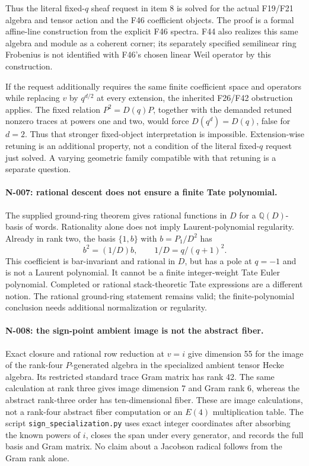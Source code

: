 Thus the literal fixed-$q$ sheaf request in item 8 is solved for the
actual F19/F21 algebra and tensor action and the F46 coefficient
objects.  The proof is a formal affine-line construction from the
explicit F46 spectra.  F44 also realizes this same algebra and
module as a coherent corner; its separately specified semilinear
ring Frobenius is not identified with F46's chosen linear Weil
operator by this construction.

If the request additionally requires the same finite coefficient
space and operators while replacing $v$ by $q^{d/2}$ at every extension,
the inherited F26/F42 obstruction applies.  The fixed relation
$P^2=D(q)P$, together with the demanded retuned nonzero traces at
powers one and two, would force $D(q^d)=D(q)$, false for $d=2$.
Thus that stronger fixed-object interpretation is impossible.
Extension-wise retuning is an additional property, not a condition of
the literal fixed-$q$ request just solved.  A varying geometric family
compatible with that retuning is a separate question.

\paragraph{N-007: rational descent does not ensure a finite Tate polynomial.}
The supplied ground-ring theorem gives rational functions in $D$ for
a $\mathbb Q(D)$-basis of words.  Rationality alone does not imply
Laurent-polynomial regularity.  Already in rank two, the basis
$\{1,b\}$ with $b=P_1/D^2$ has
\[
                        b^2=(1/D)b,
 \qquad 1/D=q/(q+1)^2.
\]
This coefficient is bar-invariant and rational in $D$, but has a pole
at $q=-1$ and is not a Laurent polynomial.  It cannot be a finite
integer-weight Tate Euler polynomial.  Completed or rational
stack-theoretic Tate expressions are a different notion.  The
rational ground-ring statement remains valid; the finite-polynomial
conclusion needs additional normalization or regularity.

\paragraph{N-008: the sign-point ambient image is not the abstract fiber.}
Exact closure and rational row reduction at $v=i$ give dimension 55
for the image of the rank-four $P$-generated algebra in the specialized
ambient tensor Hecke algebra.  Its restricted standard trace Gram
matrix has rank 42.  The same calculation at rank three gives image
dimension 7 and Gram rank 6, whereas the abstract rank-three order
has ten-dimensional fiber.  These are image calculations, not a
rank-four abstract fiber computation or an $E(4)$ multiplication table.
The script \nolinkurl{sign_specialization.py} uses exact integer
coordinates after absorbing the known powers of $i$, closes the span
under every generator, and records the full basis and Gram matrix.
No claim about a Jacobson radical follows from the Gram rank alone.

